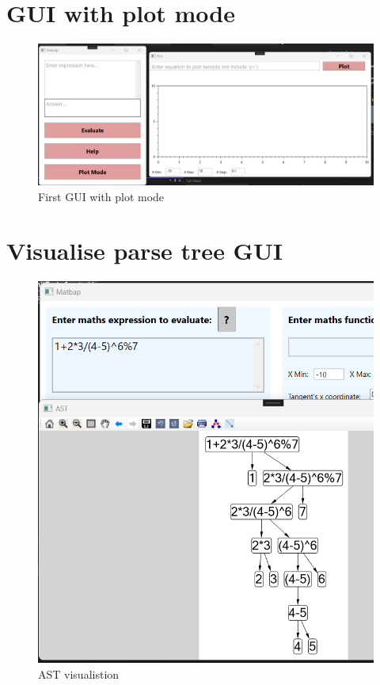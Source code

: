 \documentclass[a4paper, oneside, 11pt]{report}
\begin{document}
\section{GUI with plot mode}
\begin{figure}[H]
\begin{center}
\includegraphics[scale=0.5]{FirstGUIWithPlotModepng.png}
\caption{First GUI with plot mode}
\label{firstGUIWithPlotMode}
\end{center}
\end{figure}

\section{Visualise parse tree GUI}
\begin{figure}[H]
\begin{center}
\includegraphics[scale=0.5]{VisualuseASTGUI.png}
\caption{AST visualistion}
\label{basicgui}
\end{center}
\end{figure}
\end{document}
